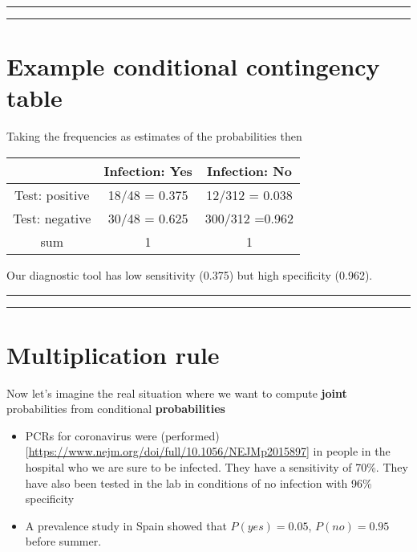 \documentclass[
]{book}
\begin{document}
\begin{center}\rule{0.5\linewidth}{0.5pt}\end{center}

\begin{center}\rule{0.5\linewidth}{0.5pt}\end{center}

\hypertarget{example-conditional-contingency-table}{%
\section{Example conditional contingency table}\label{example-conditional-contingency-table}}

Taking the frequencies as estimates of the probabilities then

\begin{longtable}[]{@{}ccc@{}}
\toprule
& Infection: Yes & Infection: No \\
\midrule
\endhead
Test: positive & 18/48 = 0.375 & 12/312 = 0.038 \\
Test: negative & 30/48 = 0.625 & 300/312 =0.962 \\
sum & 1 & 1 \\
\bottomrule
\end{longtable}

Our diagnostic tool has low sensitivity (0.375) but high
specificity (0.962).

\begin{center}\rule{0.5\linewidth}{0.5pt}\end{center}

\begin{center}\rule{0.5\linewidth}{0.5pt}\end{center}

\hypertarget{multiplication-rule}{%
\section{Multiplication rule}\label{multiplication-rule}}

Now let's imagine the real situation where we want to compute \textbf{joint} probabilities from conditional \textbf{probabilities}

\begin{itemize}
\item
  PCRs for coronavirus were (performed){[}\url{https://www.nejm.org/doi/full/10.1056/NEJMp2015897}{]} in people in the hospital who we are sure to be infected. They have a sensitivity of 70\%. They have also been tested in the lab in conditions of no infection with 96\% specificity
\item
  A prevalence study in Spain showed that \(P(yes)=0.05\), \(P(no)=0.95\) before summer.
\end{itemize}
\end{document}
